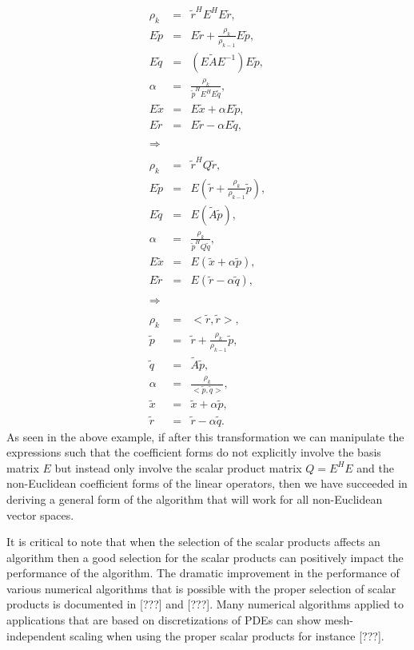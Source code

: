 \documentclass[pdf,ps2pdf,11pt]{SANDreport}
\begin{document}
\begin{eqnarray*}
\rho_k & = & \tilde{r}^H E^H E \tilde{r}, \\
E \tilde{p} & = & E \tilde{r} + \frac{\rho_k}{\rho_{k-1}} E \tilde{p}, \\
E \tilde{q} & = & ( E \tilde{A} E^{-1} ) E \tilde{p}, \\
\alpha & = & \frac{\rho_k}{\tilde{p}^H E^H E \tilde{q}}, \\
E \tilde{x} & = & E \tilde{x} + \alpha E \tilde{p}, \\
E \tilde{r} & = & E \tilde{r} - \alpha E \tilde{q}, \\
\\
\Rightarrow \\
\\
\rho_k & = & \tilde{r}^H Q \tilde{r}, \\
E \tilde{p} & = & E ( \tilde{r} + \frac{\rho_k}{\rho_{k-1}} \tilde{p} ), \\
E \tilde{q} & = & E ( \tilde{A} \tilde{p} ), \\
\alpha & = & \frac{\rho_k}{\tilde{p}^H Q \tilde{q}}, \\
E \tilde{x} & = & E ( \tilde{x} + \alpha \tilde{p}), \\
E \tilde{r} & = & E ( \tilde{r} - \alpha \tilde{q}), \\
\\
\Rightarrow \\
\\
\rho_k & = & <\tilde{r},\tilde{r}>, \\
\tilde{p} & = & \tilde{r} + \frac{\rho_k}{\rho_{k-1}} \tilde{p}, \\
\tilde{q} & = & \tilde{A} \tilde{p}, \\
\alpha & = & \frac{\rho_k}{<\tilde{p},\tilde{q}>}, \\
\tilde{x} & = & \tilde{x} + \alpha \tilde{p}, \\
\tilde{r} & = & \tilde{r} - \alpha \tilde{q}.
\end{eqnarray*}
%
As seen in the above example, if after this transformation we can manipulate
the expressions such that the coefficient forms do not explicitly involve the
basis matrix $E$ but instead only involve the scalar product matrix $Q = E^H
E$ and the non-Euclidean coefficient forms of the linear operators, then we
have succeeded in deriving a general form of the algorithm that will work for
all non-Euclidean vector spaces.

It is critical to note that when the selection of the scalar products affects
an algorithm then a good selection for the scalar products can positively
impact the performance of the algorithm.  The dramatic improvement in the
performance of various numerical algorithms that is possible with the proper
selection of scalar products is documented in [???] and [???].  Many numerical
algorithms applied to applications that are based on discretizations of PDEs
can show mesh-independent scaling when using the proper scalar products for
instance [???].
\end{document}
